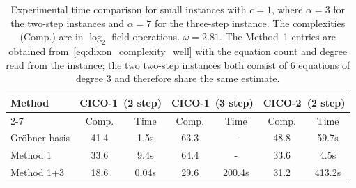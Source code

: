 \begin{table}[hbtp!]
\centering
\caption{Experimental time comparison for small \xhash instances with $c=1$, where $\alpha=3$ for the two-step instances and $\alpha=7$ for the three-step instance. The complexities (Comp.) are in $\log_2$ field operations. $\omega = 2.81$. The Method~1 entries are obtained from~\eqref{eq:dixon_complexity_well} with the equation count and degree read from the instance; the two two-step instances both consist of $6$ equations of degree $3$ and therefore share the same estimate.}
\label{tab:xhash_experimental}
\begin{tabular}{l|cc|cc|cc}
\toprule
\multirow{2}{*}{Method} & \multicolumn{2}{c|}{CICO-1~(2 step)} & \multicolumn{2}{c|}{CICO-1~(3 step)} & \multicolumn{2}{c}{CICO-2~(2 step)} \\
\cmidrule{2-7}
 & Comp. & Time & Comp. & Time & Comp. & Time \\
\midrule
Gr\"obner basis & 41.4 & 1.5s & 63.3 & - & 48.8 & 59.7s \\
Method 1 & 33.6 & 9.4s & 64.4 & - & 33.6 & 4.5s \\
Method 1+3 & 18.6 & 0.04s & 29.6 & 200.4s & 31.2 & 413.2s \\
\bottomrule
\end{tabular}
\end{table}

